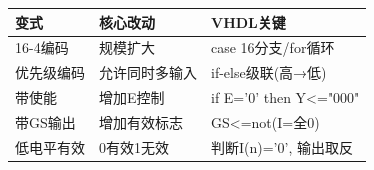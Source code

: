 \begin{examfocus}
\begin{center}
\begin{tabular}{|l|l|l|}
\hline
\textbf{变式} & \textbf{核心改动} & \textbf{VHDL关键} \\
\hline
16-4编码 & 规模扩大 & case 16分支/for循环 \\
优先级编码 & 允许同时多输入 & if-else级联(高→低) \\
带使能 & 增加E控制 & if E='0' then Y<="000" \\
带GS输出 & 增加有效标志 & GS<=not(I=全0) \\
低电平有效 & 0有效1无效 & 判断I(n)='0', 输出取反 \\
\hline
\end{tabular}
\end{center}
\end{examfocus}
